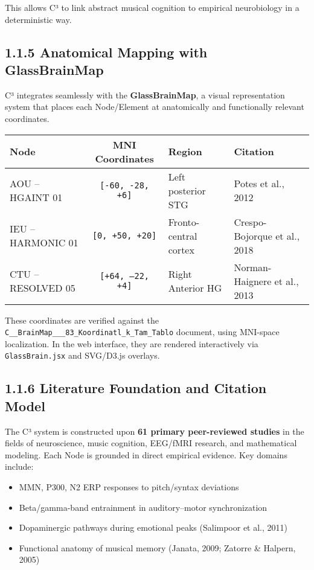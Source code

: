 \documentclass[10pt]{article}
\begin{document}
This allows C³ to link abstract musical cognition to empirical neurobiology in a deterministic way.

\subsection*{1.1.5 Anatomical Mapping with GlassBrainMap}

C³ integrates seamlessly with the \textbf{GlassBrainMap}, a visual representation system that places each Node/Element at anatomically and functionally relevant coordinates.

\begin{center}
\begin{tabular}{|l|c|l|l|}
\hline
\textbf{Node} & \textbf{MNI Coordinates} & \textbf{Region} & \textbf{Citation} \\
\hline
AOU – HGAINT 01 & \texttt{[-60, -28, +6]} & Left posterior STG & Potes et al., 2012 \\
IEU – HARMONIC 01 & \texttt{[0, +50, +20]} & Fronto-central cortex & Crespo-Bojorque et al., 2018 \\
CTU – RESOLVED 05 & \texttt{[+64, –22, +4]} & Right Anterior HG & Norman-Haignere et al., 2013 \\
\hline
\end{tabular}
\end{center}

These coordinates are verified against the \texttt{C\_\_BrainMap\_\_\_83\_Koordinatl\_k\_Tam\_Tablo} document, using MNI-space localization. In the web interface, they are rendered interactively via \texttt{GlassBrain.jsx} and SVG/D3.js overlays.

\subsection*{1.1.6 Literature Foundation and Citation Model}

The C³ system is constructed upon \textbf{61 primary peer-reviewed studies} in the fields of neuroscience, music cognition, EEG/fMRI research, and mathematical modeling. Each Node is grounded in direct empirical evidence. Key domains include:

\begin{itemize}
    \item MMN, P300, N2 ERP responses to pitch/syntax deviations
    \item Beta/gamma-band entrainment in auditory–motor synchronization
    \item Dopaminergic pathways during emotional peaks (Salimpoor et al., 2011)
    \item Functional anatomy of musical memory (Janata, 2009; Zatorre \& Halpern, 2005)
\end{itemize}
\end{document}

